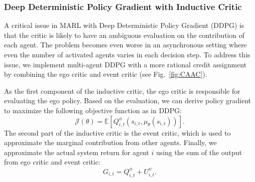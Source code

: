 \documentclass{article}
\begin{document}
\subsubsection{Deep Deterministic Policy Gradient with Inductive Critic}

A critical issue in MARL with Deep Deterministic Policy Gradient (DDPG) is that the critic is likely to have an ambiguous evaluation on the contribution of each agent. The problem becomes even worse in an asynchronous setting where even the number of activated agents varies in each decision step. To address this issue, we implement multi-agent DDPG with a more rational credit assignment by combining the ego critic and event critic (see Fig.~\ref{fig:CAAC}).


As the first component of the inductive critic, the ego critic is responsible for evaluating the ego policy. Based on the evaluation, we can derive policy gradient to maximize the following objective function as in DDPG:
\begin{equation}
\mathcal{J}(\theta ) = \mathbb{E} \left[ Q^{\phi }_{i,t}\left(s_{i,t},\mu_{\theta }\left(s_{i,t}\right)\right) \right].
\label{eq:actor}
\end{equation}
The second part of the inductive critic is the event critic, which is used to approximate the marginal contribution from other agents. Finally, we approximate the actual system return for agent $i$ using the sum of the output from ego critic and event critic:
\begin{equation}
G_{i,t} = Q^{\phi}_{i,t} +U^{\psi}_{i,t }.
\label{eq:sumqu}
\end{equation}
\end{document}
